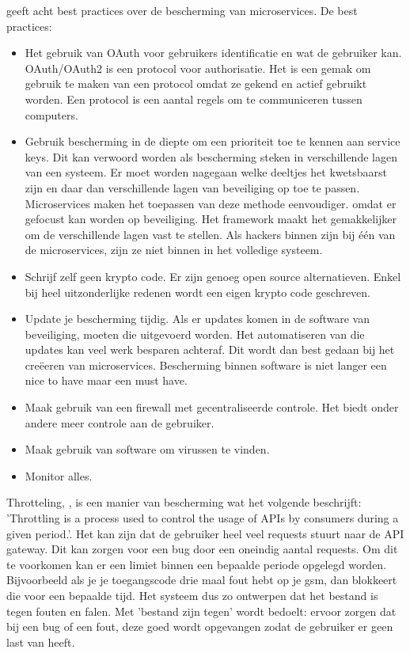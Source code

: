 \textcite{Troisi2019} geeft acht best practices over de bescherming van microservices. 
De best practices:
\begin{itemize}
	\item Het gebruik van OAuth voor gebruikers identificatie en wat de gebruiker kan. OAuth/OAuth2 is een protocol voor authorisatie. Het is een gemak om gebruik te maken van een protocol omdat ze gekend en actief gebruikt worden. Een protocol is een aantal regels om te communiceren tussen computers. 
	\item Gebruik bescherming in de diepte om een prioriteit toe te kennen aan service keys.  Dit kan verwoord worden als bescherming steken in verschillende lagen van een systeem. Er moet worden nagegaan  welke deeltjes het kwetsbaarst zijn en daar dan verschillende lagen van beveiliging op toe te passen. 
	Microservices maken het toepassen van deze methode eenvoudiger. omdat er gefocust kan worden op beveiliging. Het framework maakt het gemakkelijker om de verschillende lagen vast te stellen. Als hackers binnen zijn bij één van de microservices, zijn ze niet binnen in het volledige systeem. 
	\item Schrijf zelf geen krypto code. Er zijn genoeg open source alternatieven. Enkel bij heel uitzonderlijke redenen wordt een eigen krypto code geschreven. 
	\item Update je bescherming tijdig. Als er updates komen in de software van beveiliging, moeten die uitgevoerd worden. Het automatiseren van die updates kan veel  werk besparen achteraf. Dit wordt dan best gedaan bij het creëeren van microservices. Bescherming binnen software is niet langer een nice to have maar een must have. 
	\item Maak gebruik van een firewall met gecentraliseerde controle. Het biedt onder andere meer controle aan de gebruiker. 
	\item Maak gebruik van software om virussen te vinden.
	\item Monitor alles.
\end{itemize}

Throtteling, \textcite{Cavalcanti2018}, is een manier van bescherming wat het volgende beschrijft: 'Throttling is a process used to control the usage of APIs by consumers during a given period.'. Het kan zijn dat de gebruiker heel veel requests stuurt naar de API gateway. Dit kan zorgen voor een bug door een oneindig aantal requests. Om dit te voorkomen kan er een limiet binnen een bepaalde periode opgelegd worden. Bijvoorbeeld als je je toegangscode drie maal fout hebt op je gsm, dan blokkeert die voor een bepaalde tijd. Het systeem dus zo ontwerpen dat het bestand is tegen fouten en falen. Met 'bestand zijn tegen' wordt bedoelt: ervoor zorgen dat bij een bug of een fout, deze goed wordt opgevangen zodat de gebruiker er geen last van heeft. 

